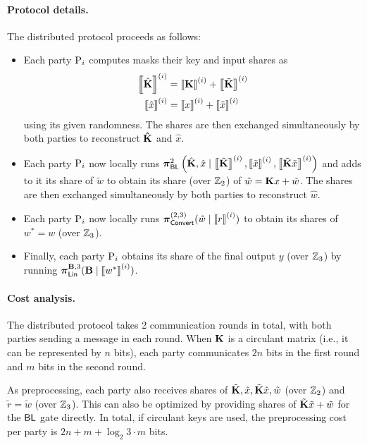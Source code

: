 \paragraph{Protocol details.}
The distributed protocol proceeds as follows:
\begin{itemize}
    \item Each party $\textnormal{P}_i$ computes masks their key and input shares as 
    \begin{align*}
    \sharei{\hat{\mat{K}}} &= \sharei{\mat{K}} + \sharei{\tilde{\mat{K}}} \\
    \sharei{\hat{x}} &= \sharei{x} + \sharei{\tilde{x}}
    \end{align*}
    using its given randomness. The shares are then exchanged simultaneously by both parties to reconstruct $\mat{\hat{K}}$ and $\hat{x}$.

    \item Each party $\textnormal{P}_i$ now locally runs $\prot_\BLMap^2 \left(\hat{\mat{K}}, \hat{x} \mid \sharei{\tilde{\mat{K}}}, \sharei{\tilde{x}}, \sharei{\tilde{\mat{K}}\tilde{x}}\right)$ and adds to it its share of $\tilde{w}$ to obtain its share (over $\mathbb{Z}_2$) of $\hat{w} = \mat{K}x + \tilde{w}$. The shares are then exchanged simultaneously by both parties to reconstruct $\hat{w}$.

    \item Each party $\textnormal{P}_i$ now locally runs $\boldsymbol{\pi}_{\textnormal{\textsf{Convert}}}^{(2,3)}(\hat{w} \mid \left\llbracket r \right\rrbracket^{(i)})$ to obtain its shares of $w^* = w$ (over $\mathbb{Z}_3$).

    \item Finally, each party $\textnormal{P}_i$ obtains its share of the final output $y$ (over $\mathbb{Z}_3$) by running $\prot_\LMap^{\mat{B}, 3}(\mat{B} \mid \sharei{w^*})$.
\end{itemize}



\paragraph{Cost analysis.}
The distributed protocol takes 2 communication rounds in total, with both parties sending a message in each round. When $\mat{K}$ is a circulant matrix (i.e., it can be represented by $n$ bits), each party communicates $2n$ bits in the first round and $m$ bits in the second round.

As preprocessing, each party also receives shares of $\tilde{\mat{K}}, \tilde{x}, \tilde{\mat{K}}\tilde{x}, \tilde{w}$ (over $\mathbb{Z}_2$) and $\tilde{r} = \tilde{w}$ (over $\mathbb{Z}_3$). This can also be optimized by providing shares of $\tilde{\mat{K}}\tilde{x} + \tilde{w}$ for the $\textnormal{\textsf{BL}}$ gate directly. In total, if circulant keys are used, the preprocessing cost per party is $2n + m + \log_2{3}\cdot m$ bits.


